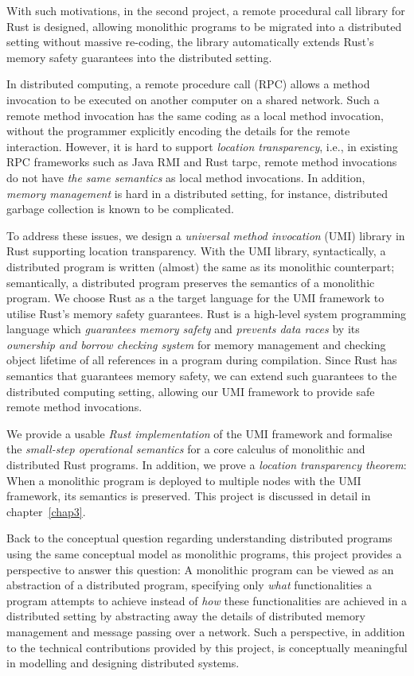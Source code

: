 With such motivations, in the second project, a remote procedural call library for Rust is designed, allowing monolithic programs to be migrated into a distributed setting without massive re-coding, the library automatically extends Rust's memory safety guarantees into the distributed setting.

In distributed computing, a remote procedure call (RPC) allows a method invocation to be executed on another computer on a shared network. Such a remote method invocation has the same coding as a local method invocation, without the programmer explicitly encoding the details for the remote interaction. However, it is hard to support \emph{location transparency}, i.e., in existing RPC frameworks such as Java RMI and Rust tarpc, remote method invocations do not have \emph{the same semantics} as local method invocations. In addition, \emph{memory management} is hard in a distributed setting, for instance, distributed garbage collection is known to be complicated.

To address these issues, we design a \emph{universal method invocation} (UMI) library in Rust supporting location transparency. With the UMI library, syntactically, a distributed program is written (almost) the same as its monolithic counterpart; semantically, a distributed program preserves the semantics of a monolithic program. We choose Rust as a the target language for the UMI framework to utilise Rust's memory safety guarantees. Rust is a high-level system programming language which \emph{guarantees memory safety} and \emph{prevents data races} by its \emph{ownership and borrow checking system} for memory management and checking object lifetime of all references in a program during compilation. Since Rust has semantics that guarantees memory safety, we can extend such guarantees to the distributed computing setting, allowing our UMI framework to provide safe remote method invocations.

We provide a usable \emph{Rust implementation} of the UMI framework and formalise the \emph{small-step operational semantics} for a core calculus of monolithic and distributed Rust programs. In addition, we prove a \emph{location transparency theorem}: When a monolithic program is deployed to multiple nodes with the UMI framework, its semantics is preserved.
This project is discussed in detail in chapter~\ref{chap3}.

Back to the conceptual question regarding understanding distributed programs using the same conceptual model as monolithic programs, this project provides a perspective to answer this question: A monolithic program can be viewed as an abstraction of a distributed program, specifying only \emph{what} functionalities a program attempts to achieve instead of \emph{how} these functionalities are achieved in a distributed setting by abstracting away the details of distributed memory management and message passing over a network. Such a perspective, in addition to the technical contributions provided by this project, is conceptually meaningful in modelling and designing distributed systems.

